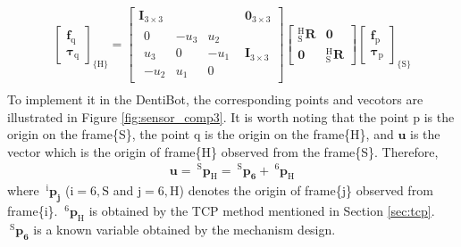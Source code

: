 \begin{equation}
\label{eq: ref_sensor}
\begin{split}
\begin{bmatrix}
\boldsymbol{f}_\mathrm{q}\\ 
\boldsymbol{\tau}_\mathrm{q}
\end{bmatrix}
_{\{ \mathrm{H}\}}
=
\begin{bmatrix}
\mathbf{I}_{3 \times 3} & \boldsymbol{0}_{3 \times 3}\\ 
\begin{matrix}
0		&-u_3		&u_2		\\
u_3		&0			&-u_1		\\
-u_2	&u_1		&0		
\end{matrix} & \mathbf{I}_{3 \times 3}
\end{bmatrix}
\begin{bmatrix}
_\mathrm{S}^\mathrm{H}\mathbf{R} & \boldsymbol{0}\\ 
\boldsymbol{0} & _\mathrm{S}^\mathrm{H}\mathbf{R}
\end{bmatrix}
\begin{bmatrix}
\boldsymbol{f}_\mathrm{p}\\ 
\boldsymbol{\tau}_\mathrm{p}
\end{bmatrix}
_{\{ \mathrm{S}\}}\\
\end{split}
\end{equation}
To implement it in the DentiBot, the corresponding points and vecotors are illustrated in Figure \ref{fig:sensor_comp3}. It is worth noting that the point $\mathrm{p}$ is the origin on the frame\{S\}, the point $\mathrm{q}$ is the origin on the frame\{H\}, and $\boldsymbol{u}$ is the vector which is the origin of frame\{H\} observed from the frame\{S\}. Therefore,
\begin{equation}
\begin{split}
\boldsymbol{u} = \ ^\mathrm{S}\boldsymbol{p}_\mathrm{H} = \ ^\mathrm{S}\boldsymbol{p_6} + \ ^\mathrm{6}\boldsymbol{p}_\mathrm{H}
\end{split}
\end{equation}
where $ \ ^\mathrm{i}\boldsymbol{p_j}$ ($\mathrm{i} = 6,\mathrm{S}$ and $\mathrm{j} = 6,\mathrm{H}$) denotes the origin of frame\{$\mathrm{j}$\} observed from frame\{$\mathrm{i}$\}. $ \ ^\mathrm{6}\boldsymbol{p}_\mathrm{H}$ is obtained by the TCP method mentioned in Section \ref{sec:tcp}. $ \ ^\mathrm{S}\boldsymbol{p_6}$ is a known variable obtained by the mechanism design.
